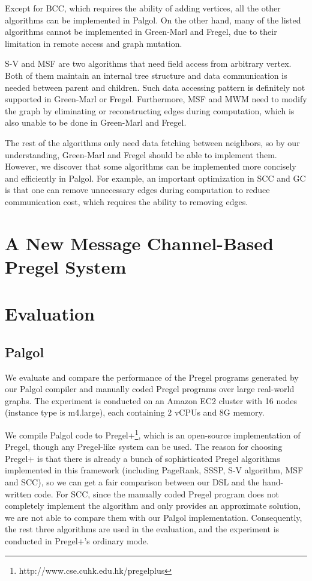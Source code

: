 \documentclass{sokendai_thesis} %
\begin{document}
Except for BCC, which requires the ability of adding vertices, all the other algorithms can be implemented in Palgol.
On the other hand, many of the listed algorithms cannot be implemented in Green-Marl and Fregel, due to their limitation in remote access and graph mutation.

S-V and MSF are two algorithms that need field access from arbitrary vertex.
Both of them maintain an internal tree structure and data communication is needed between parent and children.
Such data accessing pattern is definitely not supported in Green-Marl or Fregel.
Furthermore, MSF and MWM need to modify the graph by eliminating or reconstructing edges during computation, which is also unable to be done in Green-Marl and Fregel.

The rest of the algorithms only need data fetching between neighbors, so by our understanding, Green-Marl and Fregel should be able to implement them.
However, we discover that some algorithms can be implemented more concisely and efficiently in Palgol.
For example, an important optimization in SCC and GC is that one can remove unnecessary edges during computation to reduce communication cost, which requires the ability to removing edges.

\chapter{A New Message Channel-Based Pregel System}
\label{sec:new-system}


\chapter{Evaluation}
\label{sec:evaluation}

\section{Palgol}

We evaluate and compare the performance of the Pregel programs generated by our Palgol compiler and manually coded Pregel programs over large real-world graphs.
The experiment is conducted on an Amazon EC2 cluster with 16 nodes (instance type is m4.large), each containing 2 vCPUs and 8G memory.

We compile Palgol code to Pregel+\footnote{http://www.cse.cuhk.edu.hk/pregelplus}, which is an open-source implementation of Pregel, though any Pregel-like system can be used.
The reason for choosing Pregel+ is that there is already a bunch of sophisticated Pregel algorithms implemented in this framework (including PageRank, SSSP, S-V algorithm, MSF and SCC), so we can get a fair comparison between our DSL and the hand-written code.
For SCC, since the manually coded Pregel program does not completely implement the algorithm and only provides an approximate solution, we are not able to compare them with our Palgol implementation.
Consequently, the rest three algorithms are used in the evaluation, and the experiment is conducted in Pregel+'s ordinary mode.
\end{document}
